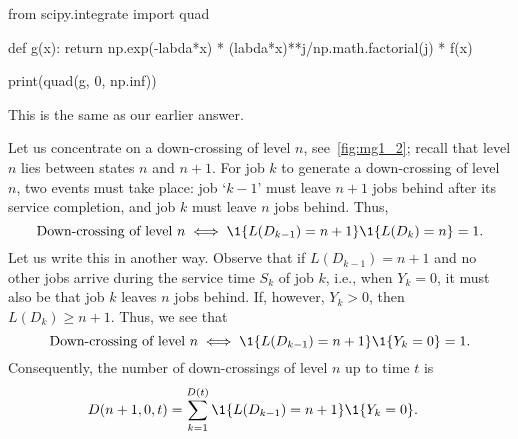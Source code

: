 \begin{exercise}
\begin{solution}
\begin{pyconsole}
from scipy.integrate import quad

def g(x):
    return np.exp(-labda*x) * (labda*x)**j/np.math.factorial(j) * f(x)

print(quad(g, 0, np.inf))
\end{pyconsole}

This is the same as our earlier answer.
\end{solution}
\end{exercise}


Let us concentrate on a down-crossing of level $n$, see~\cref{fig:mg1_2}; recall that level $n$ lies between states $n$ and $n+1$.
For job $k$ to generate a down-crossing of level $n$, two events must take place: job `$k-1$' must leave $n+1$ jobs behind after its service completion, and job $k$ must leave $n$ jobs behind.
Thus,
 \begin{equation*}
   \text{Down-crossing of level $n$} \iff \1{L(D_{k-1}) = n+1}\1{L(D_k)=n} = 1.
 \end{equation*}
Let us write this in another
way. Observe that if $L(D_{k-1})=n+1$ and no other jobs arrive during
the service time $S_k$ of job $k$, i.e., when $Y_k=0$, it must also be
that job $k$ leaves $n$ jobs behind. If, however, $Y_k>0$, then
$L(D_k)\geq n+1$.  Thus, we see that
 \begin{equation*}
   \text{Down-crossing of level $n$} \iff \1{L(D_{k-1}) = n+1}\1{Y_k=0} = 1.
 \end{equation*}
Consequently, the number of down-crossings of level $n$ up to time $t$ is
\begin{equation*}
  \begin{split}
  D(n+1, 0, t) 
&= \sum_{k=1}^{D(t)}\1{L(D_{k-1})=n+1}\1{Y_k=0}.
  \end{split}
\end{equation*}

